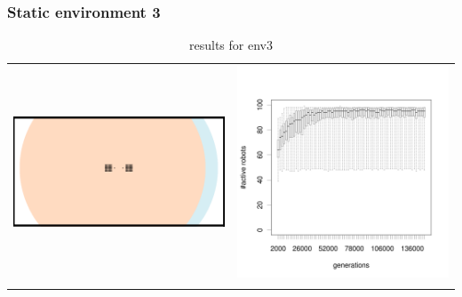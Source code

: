 \documentclass[a4paper,10pt]{article}
\begin{document}
\subsubsection{Static environment 3}
\begin{table}[h!]
\caption{results for env3}
\centering
\begin{tabular}{cc}
\includegraphics[width=\imgSize]{images/5StaticEnv/environments/staticEnv3}&\includegraphics[width=\imgSize]{images/5StaticEnv/alive_staticEnv3}\\
\newline

\end{tabular}
\end{table}
\end{document}
